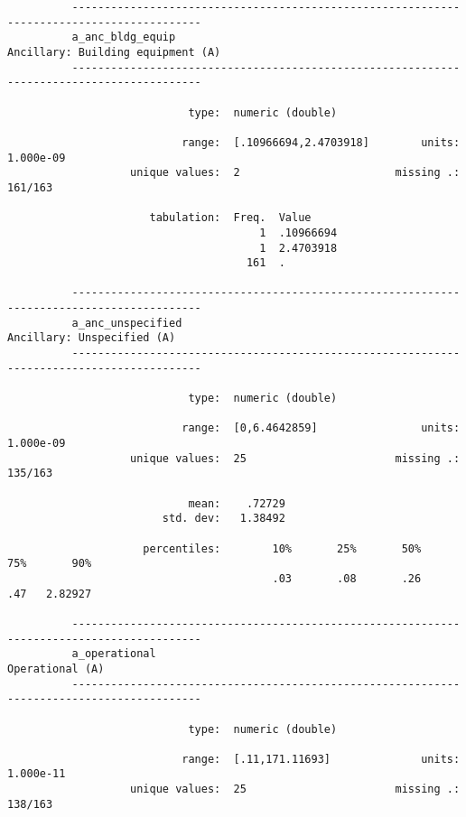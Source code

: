 \documentclass{article}
\begin{document}
\begin{verbatim}
          ------------------------------------------------------------------------------------------
          a_anc_bldg_equip                                         Ancillary: Building equipment (A)
          ------------------------------------------------------------------------------------------
          
                            type:  numeric (double)
          
                           range:  [.10966694,2.4703918]        units:  1.000e-09
                   unique values:  2                        missing .:  161/163
          
                      tabulation:  Freq.  Value
                                       1  .10966694
                                       1  2.4703918
                                     161  .
          
          ------------------------------------------------------------------------------------------
          a_anc_unspecified                                               Ancillary: Unspecified (A)
          ------------------------------------------------------------------------------------------
          
                            type:  numeric (double)
          
                           range:  [0,6.4642859]                units:  1.000e-09
                   unique values:  25                       missing .:  135/163
          
                            mean:    .72729
                        std. dev:   1.38492
          
                     percentiles:        10%       25%       50%       75%       90%
                                         .03       .08       .26       .47   2.82927
          
          ------------------------------------------------------------------------------------------
          a_operational                                                              Operational (A)
          ------------------------------------------------------------------------------------------
          
                            type:  numeric (double)
          
                           range:  [.11,171.11693]              units:  1.000e-11
                   unique values:  25                       missing .:  138/163
          

\end{verbatim}
\end{document}
